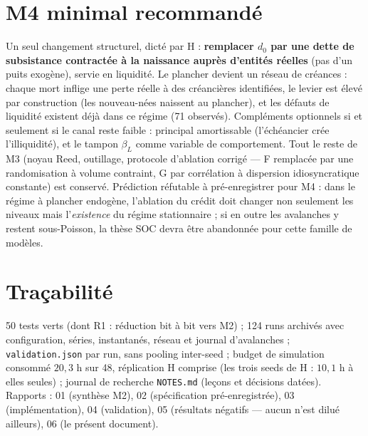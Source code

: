\documentclass[11pt,a4paper]{article}
\newcommand{\code}[1]{\texttt{#1}}
\begin{document}
\section{M4 minimal recommandé}

Un seul changement structurel, dicté par H : \textbf{remplacer $d_0$ par
une dette de subsistance contractée à la naissance auprès d'entités
réelles} (pas d'un puits exogène), servie en liquidité. Le plancher
devient un réseau de créances : chaque mort inflige une perte réelle à des
créancières identifiées, le levier est élevé par construction (les
nouveau-nées naissent au plancher), et les défauts de liquidité existent
déjà dans ce régime (71 observés). Compléments optionnels si et seulement
si le canal reste faible : principal amortissable (l'échéancier crée
l'illiquidité), et le tampon $\beta_L$ comme variable de comportement.
Tout le reste de M3 (noyau Reed, outillage, protocole d'ablation corrigé
— F remplacée par une randomisation à volume contraint, G par corrélation
à dispersion idiosyncratique constante) est conservé. Prédiction réfutable
à pré-enregistrer pour M4 : dans le régime à plancher endogène, l'ablation
du crédit doit changer non seulement les niveaux mais l'\emph{existence}
du régime stationnaire ; si en outre les avalanches y restent
sous-Poisson, la thèse SOC devra être abandonnée pour cette famille de
modèles.

\section{Traçabilité}

50 tests verts (dont R1 : réduction bit à bit vers M2) ; 124 runs archivés
avec configuration, séries, instantanés, réseau et journal d'avalanches ;
\code{validation.json} par run, sans pooling inter-seed ; budget de
simulation consommé $20{,}3$ h sur 48, réplication H comprise (les trois
seeds de H : $10{,}1$ h à elles seules) ; journal de recherche
\code{NOTES.md} (leçons et décisions datées). Rapports : 01 (synthèse M2), 02 (spécification pré-enregistrée),
03 (implémentation), 04 (validation), 05 (résultats négatifs — aucun
n'est dilué ailleurs), 06 (le présent document).
\end{document}
